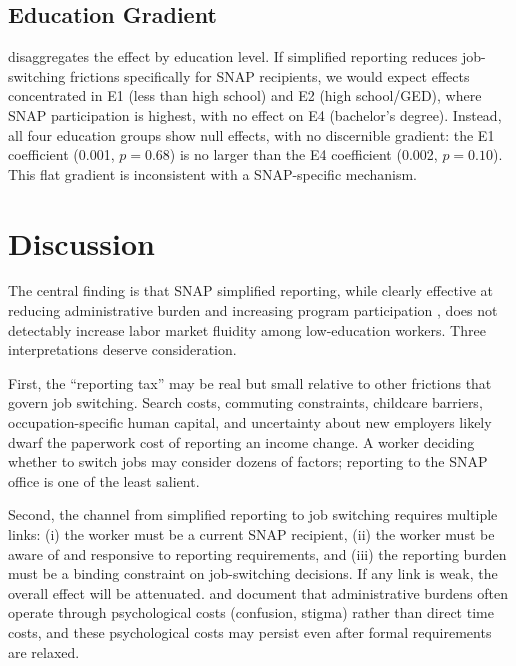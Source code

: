 \documentclass[12pt]{article}
\begin{document}
\subsection{Education Gradient}



 disaggregates the effect by education level. If simplified reporting reduces job-switching frictions specifically for SNAP recipients, we would expect effects concentrated in E1 (less than high school) and E2 (high school/GED), where SNAP participation is highest, with no effect on E4 (bachelor's degree). Instead, all four education groups show null effects, with no discernible gradient: the E1 coefficient (0.001, $p = 0.68$) is no larger than the E4 coefficient (0.002, $p = 0.10$). This flat gradient is inconsistent with a SNAP-specific mechanism.

\section{Discussion}

The central finding is that SNAP simplified reporting, while clearly effective at reducing administrative burden and increasing program participation \citep{gray2019snap, ribar2014snap}, does not detectably increase labor market fluidity among low-education workers. Three interpretations deserve consideration.

First, the ``reporting tax'' may be real but small relative to other frictions that govern job switching. Search costs, commuting constraints, childcare barriers, occupation-specific human capital, and uncertainty about new employers likely dwarf the paperwork cost of reporting an income change. A worker deciding whether to switch jobs may consider dozens of factors; reporting to the SNAP office is one of the least salient.

Second, the channel from simplified reporting to job switching requires multiple links: (i) the worker must be a current SNAP recipient, (ii) the worker must be aware of and responsive to reporting requirements, and (iii) the reporting burden must be a binding constraint on job-switching decisions. If any link is weak, the overall effect will be attenuated. \citet{bhargava2015psychological} and \citet{herd2015administrative} document that administrative burdens often operate through psychological costs (confusion, stigma) rather than direct time costs, and these psychological costs may persist even after formal requirements are relaxed.
\end{document}
